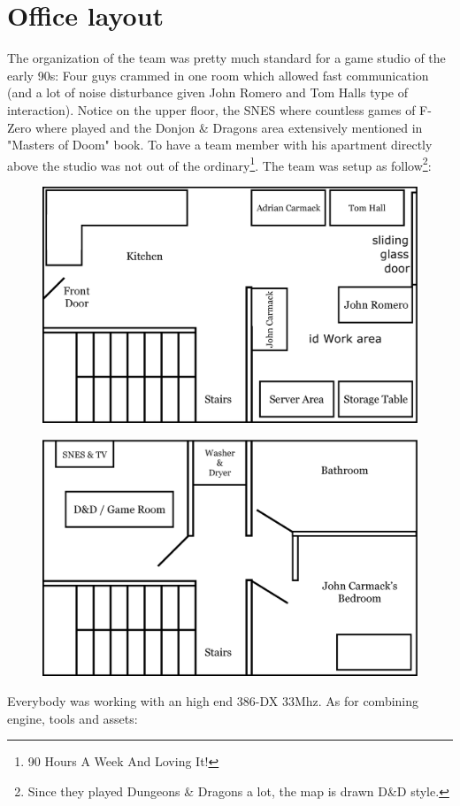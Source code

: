 \documentclass[book.tex]{subfiles}
\begin{document}
\section{Office layout}
The organization of the team was pretty much standard for a game studio of the early 90s: Four guys crammed in one room which allowed fast communication (and a lot of noise disturbance given John Romero and Tom Halls type of interaction). Notice on the upper floor, the SNES where countless games of F-Zero where played and the Donjon \& Dragons area extensively mentioned in "Masters of Doom" book. To have a team member with his apartment directly above the studio was not out of the ordinary\footnote{90 Hours A Week And Loving It!}. The team was setup as follow\footnote{Since they played Dungeons \& Dragons a lot, the map is drawn D\&D style.}:
\par
\begin{figure}[H]
  \centering
  \includegraphics[width=\textwidth]{imgs/drawings/map/id-software-office-madison_bottom_floor.eps}
\end{figure}
\par
\begin{figure}[H]
  \centering
  \includegraphics[width=\textwidth]{imgs/drawings/map/id-software-office-madison_top_floor.eps}
\end{figure}
Everybody was working with an high end 386-DX 33Mhz. As for combining engine, tools and assets:\\
\end{document}
